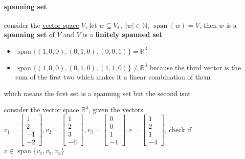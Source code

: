 \documentclass[a4paper,12pt]{article}
\DeclareMathOperator{\spn}{span}
\begin{document}
\paragraph{spanning set}
\label{sec:org780ffb0}
\begin{definition}
consider the \hyperref[sec:orgea93933]{vector space} \(V\), let \(w \subseteq V_\mathbb{F},\ |w| \in \mathbb{N},\ \spn(w)=V\), then \(w\) is a \textbf{spanning set} of \(V\) and \(V\) is a \textbf{finitely spanned set}\\
\begin{my_example}
\begin{itemize}
\item \(\spn\{(1,0,0),(0,1,0),(0,0,1)\} = \mathbb{R}^3\)\\
\item \(\spn\{(1,0,0),(0,1,0),(1,1,0)\} \neq \mathbb{R}^3\) because the third vector is the sum of the first two which makes it a linear combination of them\\
\end{itemize}
which means the first set is a spanning set but the second isnt\\
\end{my_example}
\begin{my_example}
consider the vector space \(\mathbb{R}^4\), given the vectors \(v_1= \left[\begin{array}{r} 1 \\ 2 \\ -1 \\ -2 \end{array}\right] ,v_2= \left[\begin{array}{r} 1 \\ 2 \\ 3 \\ -6 \end{array}\right] ,v_3= \left[\begin{array}{r} 0 \\ 0 \\ 1 \\ -1 \end{array}\right] ,v= \left[\begin{array}{r} 1 \\ 2 \\ 1 \\ -4 \end{array}\right]\), check if \(v \in \spn\{v_1,v_2,v_3\}\)\\

\end{my_example}
\end{definition}
\end{document}
